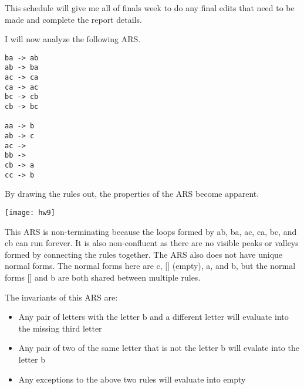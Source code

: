 \documentclass{article}
\theoremstyle{theorem}
\theoremstyle{definition}
\theoremstyle{remark}
\begin{document}
\medskip\noindent This schedule will give me all of finals week to do any final edits that need to be made and complete the report details.

\medskip\noindent
I will now analyze the following ARS.

\begin{lstlisting}
ba -> ab
ab -> ba
ac -> ca
ca -> ac
bc -> cb
cb -> bc

aa -> b
ab -> c
ac ->  
bb ->
cb -> a
cc -> b
\end{lstlisting}
%
By drawing the rules out, the properties of the ARS become apparent.

\begin{center}
\texttt{[image: hw9]}
\end{center}
%
This ARS is non-terminating because the loops formed by ab, ba, ac, ca, bc, and cb can run forever. It is also non-confluent as there are no visible peaks or valleys formed by connecting the rules together. The ARS also does not have unique normal forms. The normal forms here are c, [] (empty), a, and b, but the normal forms [] and b are both shared between multiple rules.

\medskip\noindent
The invariants of this ARS are:

\begin{itemize}
\item {Any pair of letters with the letter b and a different letter will evaluate into the missing third letter}
\item {Any pair of two of the same letter that is not the letter b will evalate into the letter b}
\item {Any exceptions to the above two rules will evaluate into empty}
\end{itemize}
\end{document}
